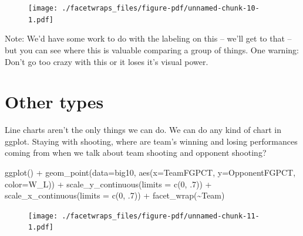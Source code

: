 \documentclass[
  letterpaper,
  DIV=11,
  numbers=noendperiod]{scrreprt}
\newenvironment{Shaded}{\begin{snugshade}}{\end{snugshade}}
\newcommand{\AttributeTok}[1]{\textcolor[rgb]{0.40,0.45,0.13}{#1}}
\newcommand{\DecValTok}[1]{\textcolor[rgb]{0.68,0.00,0.00}{#1}}
\newcommand{\FunctionTok}[1]{\textcolor[rgb]{0.28,0.35,0.67}{#1}}
\newcommand{\NormalTok}[1]{\textcolor[rgb]{0.00,0.23,0.31}{#1}}
\newcommand{\SpecialCharTok}[1]{\textcolor[rgb]{0.37,0.37,0.37}{#1}}
\begin{document}
\begin{figure}[H]

{\centering \texttt{[image: ./facetwraps\_files/figure-pdf/unnamed-chunk-10-1.pdf]}

}

\end{figure}

Note: We'd have some work to do with the labeling on this -- we'll get
to that -- but you can see where this is valuable comparing a group of
things. One warning: Don't go too crazy with this or it loses it's
visual power.

\hypertarget{other-types}{%
\section{Other types}\label{other-types}}

Line charts aren't the only things we can do. We can do any kind of
chart in ggplot. Staying with shooting, where are team's winning and
losing performances coming from when we talk about team shooting and
opponent shooting?

\begin{Shaded}
\begin{Highlighting}[]
\FunctionTok{ggplot}\NormalTok{() }\SpecialCharTok{+} 
  \FunctionTok{geom\_point}\NormalTok{(}\AttributeTok{data=}\NormalTok{big10, }\FunctionTok{aes}\NormalTok{(}\AttributeTok{x=}\NormalTok{TeamFGPCT, }\AttributeTok{y=}\NormalTok{OpponentFGPCT, }\AttributeTok{color=}\NormalTok{W\_L)) }\SpecialCharTok{+}
  \FunctionTok{scale\_y\_continuous}\NormalTok{(}\AttributeTok{limits =} \FunctionTok{c}\NormalTok{(}\DecValTok{0}\NormalTok{, .}\DecValTok{7}\NormalTok{)) }\SpecialCharTok{+} 
  \FunctionTok{scale\_x\_continuous}\NormalTok{(}\AttributeTok{limits =} \FunctionTok{c}\NormalTok{(}\DecValTok{0}\NormalTok{, .}\DecValTok{7}\NormalTok{)) }\SpecialCharTok{+} 
  \FunctionTok{facet\_wrap}\NormalTok{(}\SpecialCharTok{\textasciitilde{}}\NormalTok{Team)}
\end{Highlighting}
\end{Shaded}

\begin{figure}[H]

{\centering \texttt{[image: ./facetwraps\_files/figure-pdf/unnamed-chunk-11-1.pdf]}

}

\end{figure}

\end{document}
